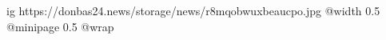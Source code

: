  
 
 
 
 

\ifcmt
  ig https://donbas24.news/storage/news/r8mqobwuxbeaucpo.jpg
  @width 0.5
  @minipage 0.5
  @wrap \parpic[r]
\fi
